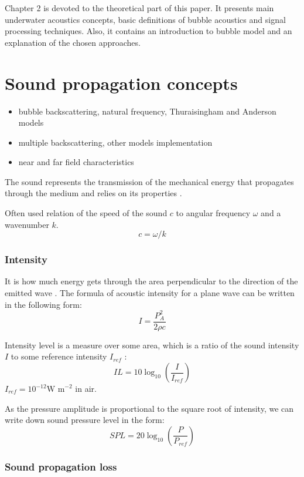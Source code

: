 Chapter 2 is devoted to the theoretical part of this paper. It presents main underwater acoustics concepts, basic definitions of bubble acoustics  and signal processing techniques. Also, it contains an introduction to bubble model and an explanation of the chosen approaches.

\section{Sound propagation concepts}
\begin{itemize}
    \item bubble backscattering, natural frequency, Thuraisingham and Anderson models
    \item multiple backscattering, other models implementation
    \item near and far field characteristics
\end{itemize}
The sound represents the transmission of the mechanical energy that  propagates through the medium and relies on its properties \cite[p.1]{leighton_acoustic_2012}.

Often used relation of the speed of the sound $c$ to angular frequency $\omega$ and a wavenumber $k$. 
 \[c = \omega / k\]

\subsubsection{Intensity} 
It is how much energy gets through the area perpendicular to the direction of the emitted wave \cite[p.18]{leighton_acoustic_2012}. The formula of acoustic intensity for a plane wave can be written in the following form:%
\[I = \frac{P_A^2}{2\rho c}\]

Intensity level is a measure over some area, which is a ratio of the sound intensity $I$ to some reference intensity $I_{ref}$ \cite[p.19]{leighton_acoustic_2012}:
\[IL = 10\log_{10}(\frac{I}{I_{ref}})\]
$I_{ref}=10^{-12} \text{W m}^{-2}$ in air.

As the pressure amplitude is proportional to the square root of intensity, we can write down sound pressure level in the form:
\[SPL = 20\log_{10}(\frac{P}{P_{ref}})\]

\subsubsection{Sound propagation loss} 

